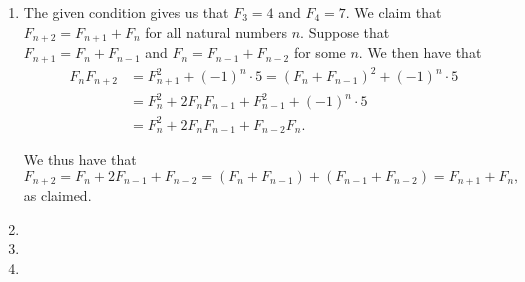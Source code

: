 \documentclass[12pt]{article}
\begin{document}
\begin{enumerate}
\item %
The given condition gives us that $F_3 = 4$ and $F_4 = 7$. We claim that $F_{n +
2} = F_{n + 1} + F_{n}$ for all natural numbers $n$. Suppose that $F_{n + 1} =
F_{n} + F_{n - 1}$ and $F_n = F_{n - 1} + F_{n - 2}$ for some $n$. We then have
that
\begin{align*}
  F_{n} F_{n + 2} & = F_{n + 1}^2 + {(-1)}^{n} \cdot 5 
     = {\left(F_n + F_{n - 1}\right)}^2 + {(-1)}^{n} \cdot 5 \\
     & = F_n^2 + 2 F_n F_{n-1} + F_{n - 1}^2 + {(-1)}^{n} \cdot 5 \\
     & = F_n^2 + 2F_n F_{n-1} + F_{n - 2} F_n. 
\end{align*}

We thus have that
\[
    F_{n + 2} = F_n + 2F_{n - 1} + F_{n - 2} = (F_n + F_{n - 1}) + (F_{n - 1} +
    F_{n - 2}) = F_{n + 1} + F_n,
\]
as claimed.

\item %


\item %


\item %


\end{enumerate}
\end{document}
